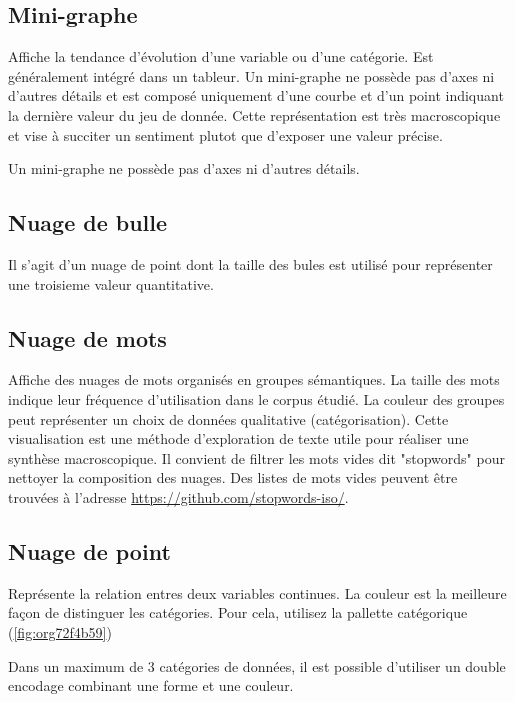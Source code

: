\documentclass[a4paper,12pt]{article}
\begin{document}
\begin{multicols}{2}
\subsection*{Mini-graphe}
\label{sec:org6b6dd90}
Affiche la tendance d'évolution d'une variable ou d'une catégorie. Est généralement intégré dans un tableur. Un mini-graphe ne possède pas d'axes ni d'autres détails et est composé uniquement d'une courbe et d'un point indiquant la dernière valeur du jeu de donnée. \autocite{sosulskiGraphics2019} Cette représentation est très macroscopique et vise à succiter un sentiment plutot que d'exposer une valeur précise. \autocite{jonathanschwabishDistribution2021}

Un mini-graphe ne possède pas d'axes ni d'autres détails.
\subsection*{Nuage de bulle}
\label{sec:org3b57297}
Il s'agit d'un nuage de point dont la taille des bules est utilisé pour représenter une troisieme valeur quantitative. \autocite{alansmithLexiqueVisuel}
\subsection*{Nuage de mots}
\label{sec:org7c6858a}
Affiche des nuages de mots organisés en groupes sémantiques. La taille des mots indique leur fréquence d'utilisation dans le corpus étudié. La couleur des groupes peut représenter un choix de données qualitative (catégorisation). \autocite{sosulskiGraphics2019} Cette visualisation est une méthode d'exploration de texte utile pour réaliser une synthèse macroscopique.
Il convient de filtrer les mots vides dit "stopwords" pour nettoyer la composition des nuages. \autocite{jonathanschwabishQualitative2021} Des listes de mots vides peuvent être trouvées à l'adresse \url{https://github.com/stopwords-iso/}.
\subsection*{Nuage de point}
\label{sec:orga32ce38}
Représente la relation entres deux variables continues. \autocite{alansmithLexiqueVisuel}
La couleur est la meilleure façon de distinguer les catégories.\autocite{stephenfewComponentlevelGraphDesign2012} Pour cela, utilisez la pallette catégorique (\ref{fig:org72f4b59})

Dans un maximum de 3 catégories de données, il est possible d'utiliser un double encodage combinant une forme et une couleur.\autocite{andreaskrauseBestPracticesData2024}


\end{multicols}
\end{document}
